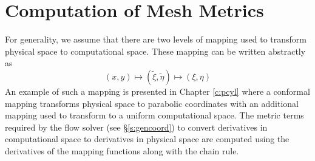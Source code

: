 %
%
%
%
%
\chapter{Computation of Mesh Metrics \label{a:metrics}}

For generality, we assume that there are two levels of mapping used to
transform physical space to computational space.  These mapping can be written
abstractly as
%
\begin{equation}
  (x,y) \mapsto (\tilde\xi,\tilde\eta) \mapsto (\xi,\eta)
\end{equation}
%
An example of such a mapping is presented in Chapter \ref{c:pcyl} where a
conformal mapping transforms physical space to parabolic coordinates with an
additional mapping used to transform to a uniform computational space.  The
metric terms required by the flow solver (see \S\ref{s:gencoord}) to convert
derivatives in computational space to derivatives in physical space are
computed using the derivatives of the mapping functions along with the chain
rule.

